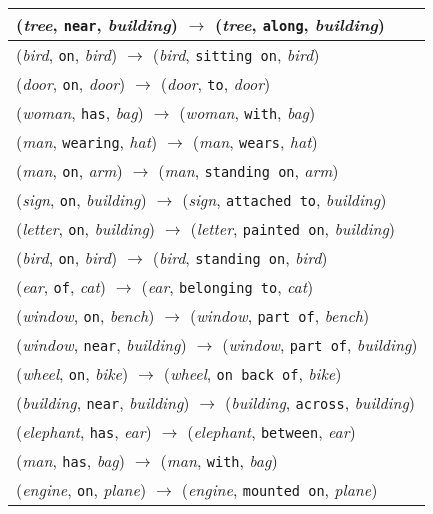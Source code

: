 \documentclass[runningheads]{llncs}
\begin{document}
{\begin{longtable}{ l }
(\textit{tree}, \texttt{near}, \textit{building}) $\rightarrow$ (\textit{tree}, \texttt{along}, \textit{building}) \\ \hline
(\textit{bird}, \texttt{on}, \textit{bird}) $\rightarrow$ (\textit{bird}, \texttt{sitting on}, \textit{bird}) \\ \hline
(\textit{door}, \texttt{on}, \textit{door}) $\rightarrow$ (\textit{door}, \texttt{to}, \textit{door}) \\ \hline
(\textit{woman}, \texttt{has}, \textit{bag}) $\rightarrow$ (\textit{woman}, \texttt{with}, \textit{bag}) \\ \hline
(\textit{man}, \texttt{wearing}, \textit{hat}) $\rightarrow$ (\textit{man}, \texttt{wears}, \textit{hat}) \\ \hline
(\textit{man}, \texttt{on}, \textit{arm}) $\rightarrow$ (\textit{man}, \texttt{standing on}, \textit{arm}) \\ \hline
(\textit{sign}, \texttt{on}, \textit{building}) $\rightarrow$ (\textit{sign}, \texttt{attached to}, \textit{building}) \\ \hline
(\textit{letter}, \texttt{on}, \textit{building}) $\rightarrow$ (\textit{letter}, \texttt{painted on}, \textit{building}) \\ \hline
(\textit{bird}, \texttt{on}, \textit{bird}) $\rightarrow$ (\textit{bird}, \texttt{standing on}, \textit{bird}) \\ \hline
(\textit{ear}, \texttt{of}, \textit{cat}) $\rightarrow$ (\textit{ear}, \texttt{belonging to}, \textit{cat}) \\ \hline
(\textit{window}, \texttt{on}, \textit{bench}) $\rightarrow$ (\textit{window}, \texttt{part of}, \textit{bench}) \\ \hline
(\textit{window}, \texttt{near}, \textit{building}) $\rightarrow$ (\textit{window}, \texttt{part of}, \textit{building}) \\ \hline
(\textit{wheel}, \texttt{on}, \textit{bike}) $\rightarrow$ (\textit{wheel}, \texttt{on back of}, \textit{bike}) \\ \hline
(\textit{building}, \texttt{near}, \textit{building}) $\rightarrow$ (\textit{building}, \texttt{across}, \textit{building}) \\ \hline
(\textit{elephant}, \texttt{has}, \textit{ear}) $\rightarrow$ (\textit{elephant}, \texttt{between}, \textit{ear}) \\ \hline
(\textit{man}, \texttt{has}, \textit{bag}) $\rightarrow$ (\textit{man}, \texttt{with}, \textit{bag}) \\ \hline
(\textit{engine}, \texttt{on}, \textit{plane}) $\rightarrow$ (\textit{engine}, \texttt{mounted on}, \textit{plane}) \\ \hline

\end{longtable}}
\end{document}
